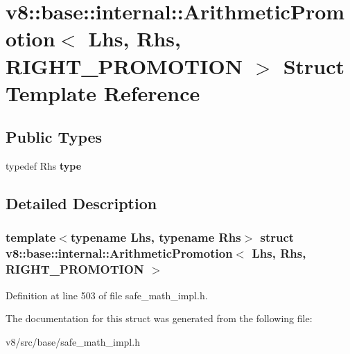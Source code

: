 \hypertarget{structv8_1_1base_1_1internal_1_1ArithmeticPromotion_3_01Lhs_00_01Rhs_00_01RIGHT__PROMOTION_01_4}{}\section{v8\+:\+:base\+:\+:internal\+:\+:Arithmetic\+Promotion$<$ Lhs, Rhs, R\+I\+G\+H\+T\+\_\+\+P\+R\+O\+M\+O\+T\+I\+ON $>$ Struct Template Reference}
\label{structv8_1_1base_1_1internal_1_1ArithmeticPromotion_3_01Lhs_00_01Rhs_00_01RIGHT__PROMOTION_01_4}
\subsection*{Public Types}
\begin{DoxyCompactItemize}
\item 
\mbox{\label{structv8_1_1base_1_1internal_1_1ArithmeticPromotion_3_01Lhs_00_01Rhs_00_01RIGHT__PROMOTION_01_4_a95c5df9835e2fe65234e08aff0c957b2}} 
typedef Rhs {\bfseries type}
\end{DoxyCompactItemize}


\subsection{Detailed Description}
\subsubsection*{template$<$typename Lhs, typename Rhs$>$\newline
struct v8\+::base\+::internal\+::\+Arithmetic\+Promotion$<$ Lhs, Rhs, R\+I\+G\+H\+T\+\_\+\+P\+R\+O\+M\+O\+T\+I\+O\+N $>$}



Definition at line 503 of file safe\+\_\+math\+\_\+impl.\+h.



The documentation for this struct was generated from the following file\+:\begin{DoxyCompactItemize}
\item 
v8/src/base/safe\+\_\+math\+\_\+impl.\+h\end{DoxyCompactItemize}
